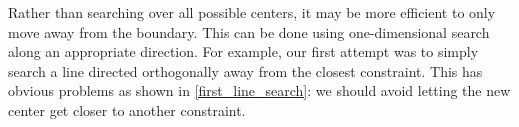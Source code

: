 \documentclass{article}
\begin{document}
% 
% 
% 
% 
% 

Rather than searching over all possible centers, it may be more efficient to only move away from the boundary.
This can be done using one-dimensional search along an appropriate direction.
For example, our first attempt was to simply search a line directed orthogonally away from the closest constraint.
This has obvious problems as shown in \cref{first_line_search}: we should avoid letting the new center get closer to another constraint.    

\end{document}
